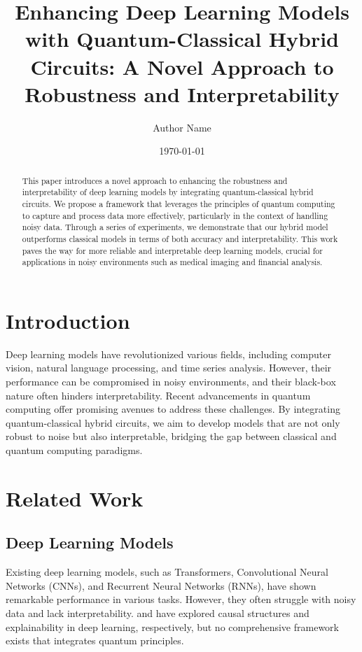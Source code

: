\documentclass{article}
\title{Enhancing Deep Learning Models with Quantum-Classical Hybrid Circuits: A Novel Approach to Robustness and Interpretability}
\author{Author Name}
\date{\today}
\begin{document}
\maketitle

\begin{abstract}
This paper introduces a novel approach to enhancing the robustness and interpretability of deep learning models by integrating quantum-classical hybrid circuits. We propose a framework that leverages the principles of quantum computing to capture and process data more effectively, particularly in the context of handling noisy data. Through a series of experiments, we demonstrate that our hybrid model outperforms classical models in terms of both accuracy and interpretability. This work paves the way for more reliable and interpretable deep learning models, crucial for applications in noisy environments such as medical imaging and financial analysis.
\end{abstract}

\section{Introduction}
Deep learning models have revolutionized various fields, including computer vision, natural language processing, and time series analysis. However, their performance can be compromised in noisy environments, and their black-box nature often hinders interpretability. Recent advancements in quantum computing offer promising avenues to address these challenges. By integrating quantum-classical hybrid circuits, we aim to develop models that are not only robust to noise but also interpretable, bridging the gap between classical and quantum computing paradigms.

\section{Related Work}
\subsection{Deep Learning Models}
Existing deep learning models, such as Transformers, Convolutional Neural Networks (CNNs), and Recurrent Neural Networks (RNNs), have shown remarkable performance in various tasks. However, they often struggle with noisy data and lack interpretability. \cite{wang2026transformerinherentlycausallearner} and \cite{alagiyawanna2026novelapproachexplainableai} have explored causal structures and explainability in deep learning, respectively, but no comprehensive framework exists that integrates quantum principles.
\end{document}
